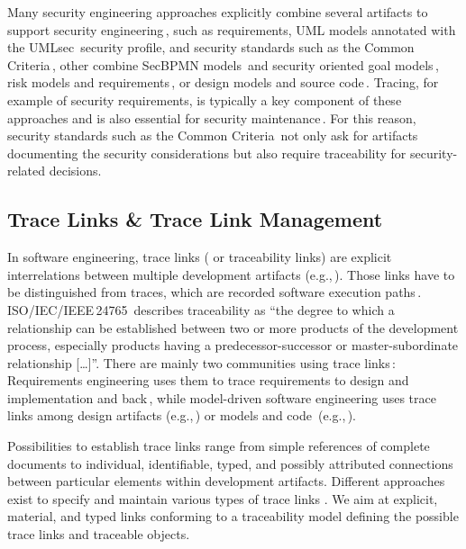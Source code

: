 Many security engineering approaches explicitly combine several artifacts to support security engineering\,\cite{Krausz2024}, such as requirements, UML models annotated with the UMLsec\,\cite{jurjens2005secure} security profile, and security standards such as the Common Criteria\,\cite{houmb2010eliciting}, other combine
SecBPMN models\,\cite{Salnitri2017DSB} and security oriented goal models\,\cite{Salnitri2020},
risk models and requirements\,\cite{5507389}, or design models and source code\,\cite{Peldszus2022}.
Tracing, for example of security requirements, is typically a key component of these approaches and is also essential for security maintenance\,\cite{Yu2008}.
For this reason, security standards such as the Common Criteria\,\cite{cc} not only ask for artifacts documenting the security considerations but also require traceability for security-related decisions.


\subsection{Trace Links \& Trace Link Management}
\label{sec:background:tracelinks}
In software engineering, trace links (%
or
traceability links)  are explicit interrelations between multiple development artifacts (e.g.,\,\cite{schwarz2010gbt}).
Those links have to be distinguished from traces, which are recorded software execution paths\,\cite{Praehofer2014,Hendriks2016}. ISO/IEC/IEEE\,24765\,\cite{ISO24765:2010} describes traceability as \enquote{the degree to which a relationship can be established between two or more products of the development process, especially products having a predecessor-successor or master-subordinate relationship %
[\dots]}. There are mainly two communities using trace links\,\cite{winkler2010survey}: %
Requirements engineering %
uses %
them
to trace requirements to design and implementation and back\,\cite{Gotel1994Trace,Pinheiro2004trace}, while model-driven software engineering uses trace links among design artifacts (e.g.,\,\cite{Mouratidis2010GDS,Ahmadian2017MBP}) or models and code~(e.g.,\,\cite{Peldszus2019SDF}).

Possibilities to establish trace links range from simple references of complete documents to individual, identifiable, typed, and possibly attributed connections between particular elements within development artifacts. %
Different approaches exist to specify and maintain \cite{winkler2010survey} various types of trace links %
\cite{spanoudakis2005software,Espinoza2006ASC}.
We aim at explicit, material, and typed links conforming to a traceability model \cite{Pinheiro2004trace,schwarz2010gbt,Grosser2022RDR} defining the possible trace links and traceable objects.

